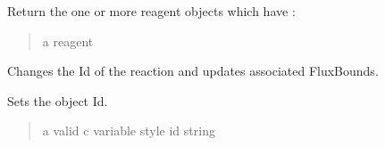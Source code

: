 \documentclass[letterpaper,12pt,english]{sphinxmanual}
\begin{document}
\begin{fulllineitems}

\begin{fulllineitems}
\label{\detokenize{api/core:cbmpy.CBModel.Reaction.getReagent}}
\pysigstartsignatures
\pysiglinewithargsret
{}
{}
{}
\pysigstopsignatures
\sphinxAtStartPar
Return the one or more reagent objects which have :
\begin{quote}\begin{description}
\sphinxAtStartPar
{} \textendash{} a reagent 

\end{description}\end{quote}

\end{fulllineitems}


\begin{fulllineitems}
\label{\detokenize{api/core:cbmpy.CBModel.Reaction.changeId}}
\pysigstartsignatures
\pysiglinewithargsret
{}
{}
{}
\pysigstopsignatures
\sphinxAtStartPar
Changes the Id of the reaction and updates associated FluxBounds.

\end{fulllineitems}


\begin{fulllineitems}
\label{\detokenize{api/core:cbmpy.CBModel.Reaction.setId}}
\pysigstartsignatures
\pysiglinewithargsret
{}
{}
{}
\pysigstopsignatures
\sphinxAtStartPar
Sets the object Id.
\begin{quote}\begin{description}
\sphinxAtStartPar
{} \textendash{} a valid c variable style id string

\end{description}\end{quote}


\end{fulllineitems}
\end{fulllineitems}
\end{document}
